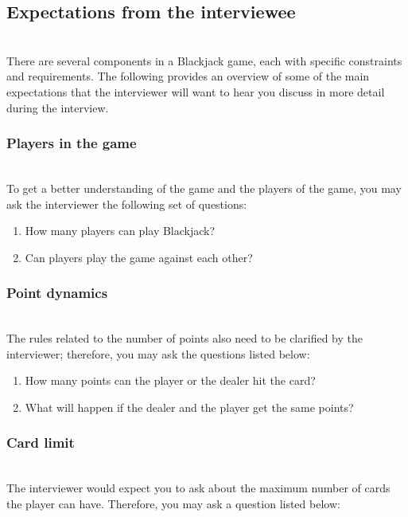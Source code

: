 \subsection{Expectations from the interviewee}\label{KfyitG1dioESlbYIcgWus-2}
\\
There are several components in a Blackjack game, each with specific constraints and requirements. The following provides an overview of some of the main expectations that the interviewer will want to hear you discuss in more detail during the interview.

\subsubsection{Players in the game}\label{axGEKWE7_JQ1jSrAUevYe}
\\
To get a better understanding of the game and the players of the game, you may ask the interviewer the following set of questions:

\begin{enumerate}
\item
\protect{}\label{5AF1QHxagfvJeaiZSM4XE}
How many players can play Blackjack?
\item
\protect{}\label{HsuA53prXMJI9_nIG5P7S}
Can players play the game against each other?
\end{enumerate}

\subsubsection{Point dynamics}\label{XFsXY3tSOqI7cdXO8-q-G}
\\
The rules related to the number of points also need to be clarified by the interviewer; therefore, you may ask the questions listed below:

\begin{enumerate}
\item
How many points can the player or the dealer hit the card?
\item
What will happen if the dealer and the player get the same points?
\end{enumerate}

\subsubsection{Card limit}\label{fo2Lgz1_AiiYBhf1BfkEc}
\\
The interviewer would expect you to ask about the maximum number of cards the player can have. Therefore, you may ask a question listed below:

